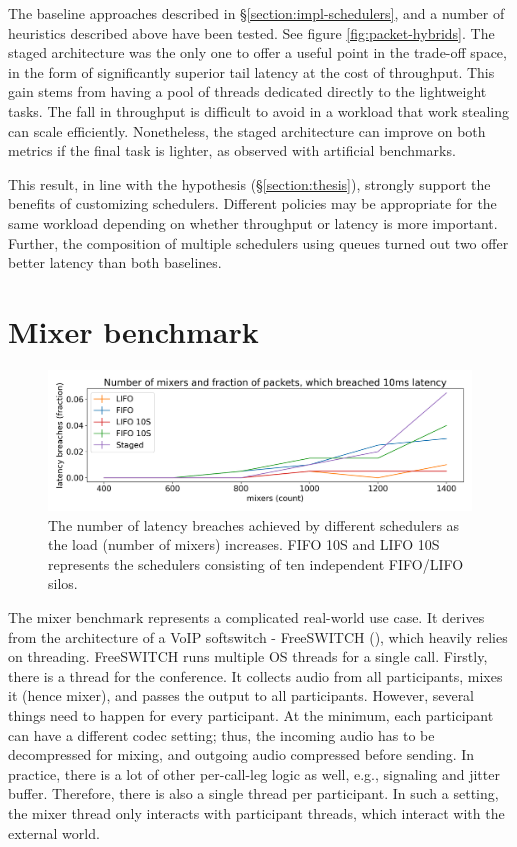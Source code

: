 \documentclass[12pt,a4paper,twoside]{report}
\begin{document}
The baseline approaches described in \S\ref{section:impl-schedulers}, and a number of heuristics described above have been tested. See figure \ref{fig:packet-hybrids}. The staged architecture was the only one to offer a useful point in the trade-off space, in the form of significantly superior tail latency at the cost of throughput. This gain stems from having a pool of threads dedicated directly to the lightweight tasks. The fall in throughput is difficult to avoid in a workload that work stealing can scale efficiently. Nonetheless, the staged architecture can improve on both metrics if the final task is lighter, as observed with artificial benchmarks. 

This result, in line with the hypothesis (\S\ref{section:thesis}), strongly support the benefits of customizing schedulers. Different policies may be appropriate for the same workload depending on whether throughput or latency is more important. Further, the composition of multiple schedulers using queues turned out two offer better latency than both baselines.

\section{Mixer benchmark}
\label{section:mixer-benchmark}

\begin{figure} 
    \centering 
    \includegraphics[width=1\textwidth]{eval/mixer-base8.png}
    \caption{The number of latency breaches achieved by different schedulers as the load (number of mixers) increases. FIFO 10S and LIFO 10S represents the schedulers consisting of ten independent FIFO/LIFO silos.}
   \label{fig:mixer-bench}
\end{figure}

The mixer benchmark represents a complicated real-world use case. It derives from the architecture of a VoIP softswitch - FreeSWITCH (\cite{Maruzzelli2017-ou}), which heavily relies on threading. FreeSWITCH runs multiple OS threads for a single call. Firstly, there is a thread for the conference. It collects audio from all participants, mixes it (hence mixer), and passes the output to all participants. However, several things need to happen for every participant. At the minimum, each participant can have a different codec setting; thus, the incoming audio has to be decompressed for mixing, and outgoing audio compressed before sending. In practice, there is a lot of other per-call-leg logic as well, e.g., signaling and jitter buffer. Therefore, there is also a single thread per participant. In such a setting, the mixer thread only interacts with participant threads, which interact with the external world. 
\end{document}
